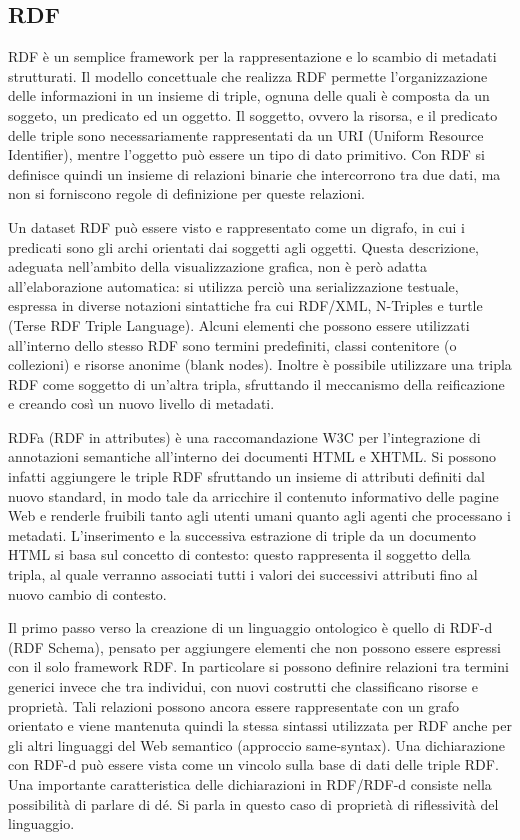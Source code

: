 \documentclass[Lau,binding=0.6cm,noexaminfo,oneside]{sapthesis}
\begin{document}
\subsection{RDF}
RDF è un semplice framework per la rappresentazione e lo scambio di metadati strutturati. Il modello concettuale che realizza RDF permette l'organizzazione delle informazioni in un insieme di triple, ognuna delle quali è composta da un soggeto, un predicato ed un oggetto. Il soggetto, ovvero la risorsa, e il predicato delle triple sono necessariamente rappresentati da un URI (Uniform Resource Identifier), mentre l'oggetto può essere un tipo di dato primitivo. Con RDF si definisce quindi un insieme di relazioni binarie che intercorrono tra due dati, ma non si forniscono regole di definizione per queste relazioni.\medskip

Un dataset RDF può essere visto e rappresentato come un digrafo, in cui i predicati sono gli archi orientati dai soggetti agli oggetti. Questa descrizione, adeguata nell'ambito della visualizzazione grafica, non è però adatta all'elaborazione automatica: si utilizza perciò una serializzazione testuale, espressa in diverse notazioni sintattiche fra cui RDF/XML, N-Triples e turtle (Terse RDF Triple Language).
Alcuni elementi che possono essere utilizzati all'interno dello stesso RDF sono termini predefiniti, classi contenitore (o collezioni) e risorse anonime (blank nodes). Inoltre è possibile utilizzare una tripla RDF come soggetto di un'altra tripla, sfruttando il meccanismo della reificazione e creando così un nuovo livello di metadati.\medskip

RDFa (RDF in attributes) è una raccomandazione W3C per l'integrazione di annotazioni semantiche all'interno dei documenti HTML e XHTML. Si possono infatti aggiungere le triple RDF sfruttando un insieme di attributi definiti dal nuovo standard, in modo tale da arricchire il contenuto informativo delle pagine Web e renderle fruibili tanto agli utenti umani quanto agli agenti che processano i metadati.
L'inserimento e la successiva estrazione di triple da un documento HTML si basa sul concetto di contesto: questo rappresenta il soggetto della tripla, al quale verranno associati tutti i valori dei successivi attributi fino al nuovo cambio di contesto.\medskip

Il primo passo verso la creazione di un linguaggio ontologico è quello di RDF-d (RDF Schema), pensato per aggiungere elementi che non possono essere espressi con il solo framework RDF. In particolare si possono definire relazioni tra termini generici invece che tra individui, con nuovi costrutti che classificano risorse e proprietà.
Tali relazioni possono ancora essere rappresentate con un grafo orientato e viene mantenuta quindi la stessa sintassi utilizzata per RDF anche per gli altri linguaggi del Web semantico (approccio same-syntax). Una dichiarazione con RDF-d può essere vista come un vincolo sulla base di dati delle triple RDF. Una importante caratteristica delle dichiarazioni in RDF/RDF-d consiste nella possibilità di parlare di dé. Si parla in questo caso di proprietà di riflessività del linguaggio.\medskip
\end{document}
